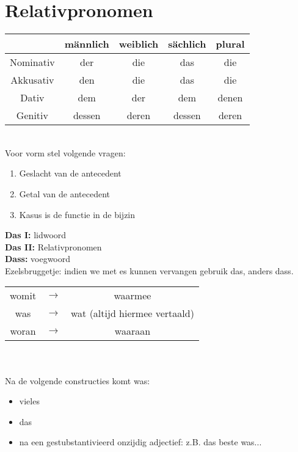 \documentclass[main.tex]{subfiles}
\begin{document}
\section{Relativpronomen}
\begin{tabular}{|c|c|c|c|c|}
\hline 
\rowcolor{gray}
& männlich & weiblich & sächlich & plural \\ 
\hline 
\cellcolor[gray]{0.8}Nominativ & der & die & das & die \\ 
\hline 
\cellcolor[gray]{0.8}Akkusativ & den & die & das & die \\ 
\hline 
\cellcolor[gray]{0.8}Dativ & dem & der & dem & denen \\ 
\hline 
\cellcolor[gray]{0.8}Genitiv & dessen & deren & dessen & deren \\ 
\hline 
\end{tabular} \\
Voor vorm stel volgende vragen:
\begin{enumerate}
\item Geslacht van de antecedent
\item Getal van de antecedent
\item Kasus is de functie in de bijzin
\end{enumerate}

\textbf{Das I:} lidwoord\\
\textbf{Das II:} Relativpronomen\\
\textbf{Dass:} voegwoord\\
Ezelsbruggetje: indien we met es kunnen vervangen gebruik das, anders dass.\\

\begin{tabular}{ccc}
womit & $\rightarrow$ & waarmee \\ 
was & $\rightarrow$ & wat (altijd hiermee vertaald) \\ 
woran & $\rightarrow$ & waaraan \\ 
\end{tabular} \\
\\
Na de volgende constructies komt was:
\begin{itemize}
\item vieles
\item das
\item na een gestubstantivieerd onzijdig adjectief: z.B. das beste was...
\end{itemize}
\end{document}
